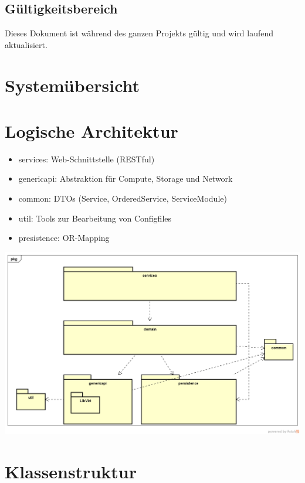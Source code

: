 \documentclass[11pt]{scrartcl}
\begin{document}
\subsection{Gültigkeitsbereich}
Dieses Dokument ist während des ganzen Projekts gültig und wird laufend aktualisiert.

\newpage

\section{Systemübersicht}

\section{Logische Architektur}
\begin{itemize}
	\item services: Web-Schnittstelle (RESTful)
	\item genericapi: Abstraktion für Compute, Storage und Network
	\item common: DTOs (Service, OrderedService, ServiceModule)
	\item util: Tools zur Bearbeitung von Configfiles
	\item presistence: OR-Mapping
\end{itemize}

\begin{center}
\includegraphics[scale=0.5]{LogischeSicht}
\end{center}

\newpage

\section{Klassenstruktur}
\end{document}
